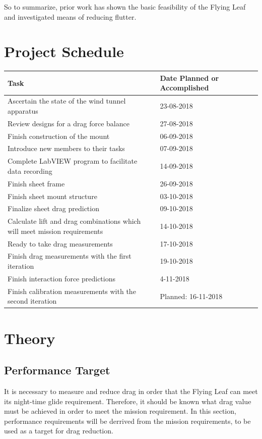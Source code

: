 \documentclass[12pt]{report} %
\begin{document}
So to summarize, prior work has shown the basic feasibility of the Flying Leaf and investigated means of reducing flutter.
 

\chapter{Project Schedule}

\begin{tabular}{|p{0.6\linewidth}|p{0.4\linewidth}|}
\hline
Task & Date Planned or Accomplished \\ \hline
Ascertain the state of the wind tunnel apparatus & 23-08-2018 \\ \hline
Review designs for a drag force balance & 27-08-2018 \\ \hline
Finish construction of the mount & 06-09-2018 \\ \hline
Introduce new members to their tasks & 07-09-2018 \\ \hline
Complete LabVIEW program to facilitate data recording & 14-09-2018 \\ \hline
Finish sheet frame & 26-09-2018 \\ \hline
Finish sheet mount structure & 03-10-2018 \\ \hline
Finalize sheet drag prediction & 09-10-2018 \\ \hline
Calculate lift and drag combinations which will meet mission requirements & 14-10-2018 \\ \hline
Ready to take drag measurements & 17-10-2018 \\ \hline
Finish drag measurements with the first iteration & 19-10-2018 \\ \hline
Finish interaction force predictions & 4-11-2018 \\ \hline
Finish calibration measurements with the second iteration & Planned: 16-11-2018 \\ \hline
\end{tabular}

\chapter{Theory}
\section{Performance Target}
It is necessary to measure and reduce drag in order that the Flying Leaf can meet its night-time glide requirement. Therefore, it should
be known what drag value must be achieved in order to meet the mission requirement. In this section, performance requirements will be
derrived from the mission requirements, to be used as a target for drag reduction.
\end{document}
